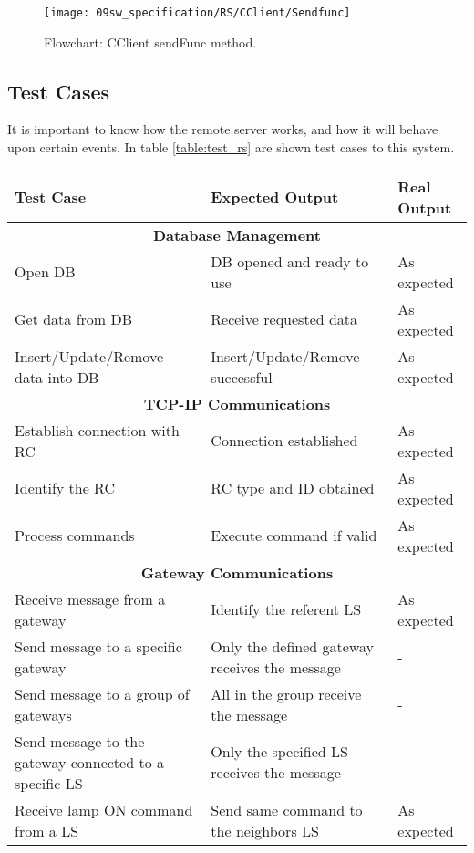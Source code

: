 \begin{figure}[H]
	\centering
	\texttt{[image: 09sw\_specification/RS/CClient/Sendfunc]}
	\caption{Flowchart: CClient sendFunc method.}
	\label{fig:RSsendfunc}
\end{figure}

\clearpage
\subsection{Test Cases}
It is important to know how the remote server works, and how it will behave upon certain events. In table \ref{table:test_rs} are shown test cases to this system.

\begin{table}[H]
	\centering
	\begin{threeparttable}
	\resizebox{\columnwidth}{!}
	{
		\begin{tabular}{|m{4cm}|m{5cm}||m{5cm}|}
			\hline
			\textbf{Test Case} & \textbf{Expected Output} & \textbf{Real Output}
			\\\hline\hline
			\multicolumn{3}{c}{\textbf{Database Management}}\\\hline
			Open DB & DB opened and ready to use & As expected
			\\\hline
			Get data from DB & Receive requested data & As expected
			\\\hline
			Insert/Update/Remove data into DB & Insert/Update/Remove successful & As expected
			\\\hline
			
			\multicolumn{3}{c}{\textbf{TCP-IP Communications}}\\\hline
			Establish connection with RC & Connection established & As expected
			\\\hline
			Identify the RC & RC type and ID obtained & As expected
			\\\hline
			Process commands & Execute command if valid & As expected
			\\\hline
			
			\multicolumn{3}{c}{\textbf{Gateway Communications}}\\\hline
			Receive message from a gateway & Identify the referent LS & As expected
			\\\hline
			Send message to a specific gateway & Only the defined gateway receives the message & -
			\\\hline
			Send message to a group of gateways & All in the group receive the message & -
			\\\hline
			Send message to the gateway connected to a specific LS & Only the specified LS receives the message & -
			\\\hline
			Receive lamp ON command from a LS & Send same command to the neighbors LS & As expected
			\\\hline
			

\end{tabular}}
\end{threeparttable}
\end{table}
